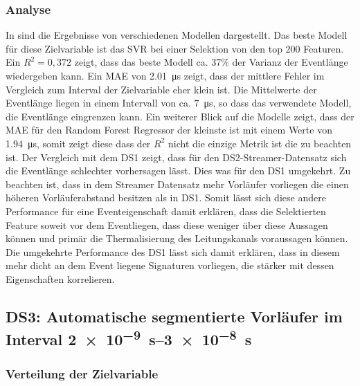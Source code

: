 \subsubsection{Analyse}
In  sind die Ergebnisse von verschiedenen Modellen dargestellt. Das beste Modell für diese Zielvariable ist das SVR bei einer Selektion von den top \(200\) Featuren. Ein \(R^2 = 0,372\) zeigt, dass das beste Modell ca. 37\% der Varianz der Eventlänge wiedergeben kann. Ein MAE von \SI{2,01}{\micro\second} zeigt, dass der mittlere Fehler im Vergleich zum Interval der Zielvariable eher klein ist. Die Mittelwerte der Eventlänge liegen in einem Intervall von ca. \SI{7}{\micro\second}, so dass das verwendete Modell, die Eventlänge eingrenzen kann. Ein weiterer Blick auf die Modelle zeigt, dass der MAE für den Random Forest Regressor der kleinste ist mit einem Werte von \SI{1,94}{\micro\second}, somit zeigt diese dass der \(R^2\) nicht die einzige Metrik ist die zu beachten ist. Der Vergleich mit dem DS1 zeigt, dass für den DS2-Streamer-Datensatz sich die Eventlänge schlechter vorhersagen lässt. Dies was für den DS1 umgekehrt. Zu beachten ist, dass in dem Streamer Datensatz mehr Vorläufer vorliegen die einen höheren Vorläuferabstand besitzen als in DS1. Somit lässt sich diese andere Performance für eine Eventeigenschaft damit erklären, dass die Selektierten Feature soweit vor dem Eventliegen, dass diese weniger über diese Aussagen können und primär die Thermalisierung des Leitungskanals voraussagen können. Die umgekehrte Performance des DS1 lässt sich damit erklären, dass in diesem mehr dicht an dem Event liegene Signaturen vorliegen, die stärker mit dessen Eigenschaften korrelieren.



\subsection{DS3: Automatische segmentierte Vorläufer im Interval \SIrange{2e-9}{3e-8}{\second}}

\subsubsection{Verteilung der Zielvariable}

